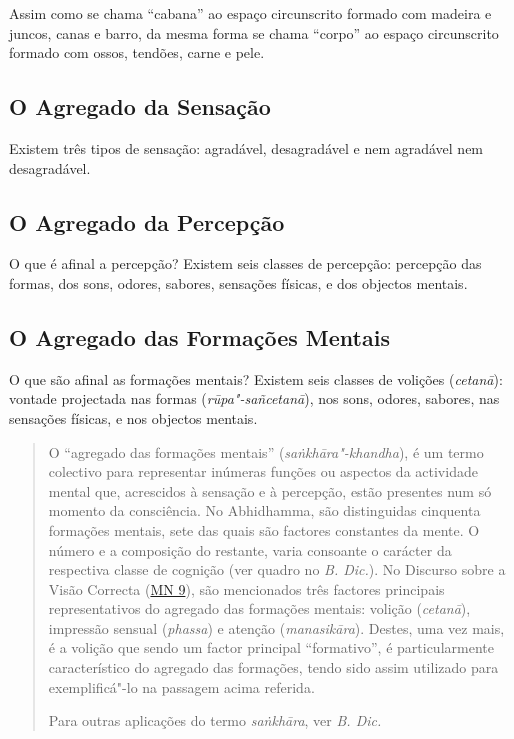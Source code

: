 Assim como se chama ``cabana'' ao espaço circunscrito formado com madeira e
juncos, canas e barro, da mesma forma se chama ``corpo'' ao espaço circunscrito
formado com ossos, tendões, carne e pele.


\subsection{O Agregado da Sensação}


Existem três tipos de sensação: agradável, desagradável e nem agradável nem
desagradável.


\subsection{O Agregado da Percepção}


O que é afinal a percepção? Existem seis classes de percepção: percepção das
formas, dos sons, odores, sabores, sensações físicas, e dos objectos mentais.

\subsection{O Agregado das Formações Mentais}


O que são afinal as formações mentais? Existem seis classes de volições
(\emph{cetanā}): vontade projectada nas formas (\emph{rūpa"-sañcetanā}), nos
sons, odores, sabores, nas sensações físicas, e nos objectos mentais.


\clearpage

\begin{quote}
  O ``agregado das formações mentais'' (\emph{sa\.{n}khāra"-khandha}), é um termo
  colectivo para representar inúmeras funções ou aspectos da actividade mental
  que, acrescidos à sensação e à percepção, estão presentes num só momento da
  consciência. No Abhidhamma, são distinguidas cinquenta formações mentais, sete
  das quais são factores constantes da mente. O número e a composição do
  restante, varia consoante o carácter da respectiva classe de cognição (ver
  quadro no \emph{B. Dic.}). No Discurso sobre a Visão Correcta (\href{https://suttacentral.net/mn9/en/bodhi}{MN 9}),
  são mencionados três factores principais representativos do agregado das
  formações mentais: volição (\emph{cetanā}), impressão sensual (\emph{phassa})
  e atenção (\emph{manasikāra}). Destes, uma vez mais, é a volição que sendo um
  factor principal ``formativo'', é particularmente característico do agregado
  das formações, tendo sido assim utilizado para exemplificá"-lo na passagem
  acima referida.

  Para outras aplicações do termo \emph{sa\.{n}khāra}, ver \emph{B. Dic.}
\end{quote}

